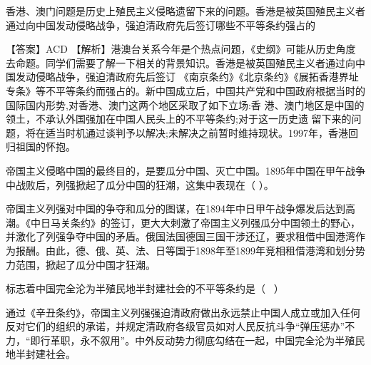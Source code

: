 \question 香港、澳门问题是历史上殖民主义侵略遗留下来的问题。香港是被英国殖民主义者通过向中国发动侵略战争，强迫清政府先后签订哪些不平等条约强占的
\par{}
\begin{solution}【答案】ACD
【解析】港澳台关系今年是个热点问题，《史纲》可能从历史角度去命题。同学们需要了解一下相关的背景知识。香港是被英国殖民主义者通过向中国发动侵略战争，强迫清政府先后签订
《南京条约》《北京条约》《展拓香港界址专条》等不平等条约而强占的。新中国成立后，中国共产党和中国政府根据当时的国际国内形势,对香港、澳门这两个地区采取了如下立场:香
港、澳门地区是中国的领土，不承认外国强加在中国人民头上的不平等条约;对于这一历史遗
留下来的问题，将在适当时机通过谈判予以解决;未解决之前暂时维持现状。1997年，香港回归祖国的怀抱。
\end{solution}
\question 帝国主义侵略中国的最终目的，是要瓜分中国、灭亡中国。1895年中国在甲午战争中战败后，列强掀起了瓜分中国的狂潮，这集中表现在（
）。
\par{}
\begin{solution}帝国主义列强对中国的争夺和瓜分的图谋，在1894年中日甲午战争爆发后达到高潮。《中日马关条约》的签订，更大大刺激了帝国主义列强瓜分中国领土的野心，并激化了列强争夺中国的矛盾。俄国法国德国三国干涉还辽，要求租借中国港湾作为报酬。由此，德、俄、英、法、日等国于1898年至1899年竞相租借港湾和划分势力范围，掀起了瓜分中国才狂潮。
\end{solution}
\question 标志着中国完全沦为半殖民地半封建社会的不平等条约是（ ~）
\par{}
\begin{solution}通过《辛丑条约》，帝国主义列强强迫清政府做出永远禁止中国人成立或加入任何反对它们的组织的承诺，并规定清政府各级官员如对人民反抗斗争``弹压惩办''不力，``即行革职，永不叙用''。中外反动势力彻底勾结在一起，中国完全沦为半殖民地半封建社会。
\end{solution}
